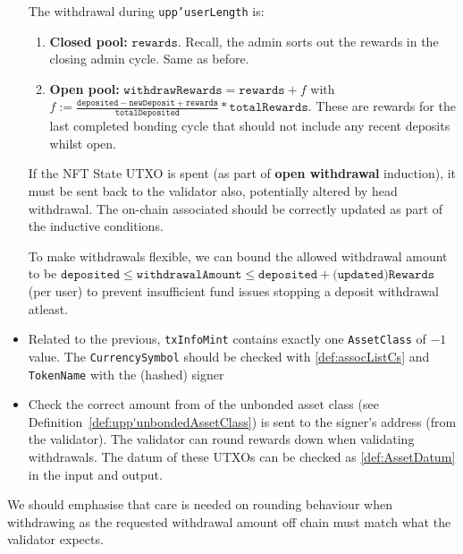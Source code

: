 \documentclass[10pt, a4paper]{article}
\theoremstyle{definition}
\begin{document}
\begin{itemize}
{The withdrawal during \texttt{upp'userLength} is:
\begin{enumerate}
\item{\textbf{Closed pool:}
 $\texttt{rewards}$.  Recall, the admin sorts out the rewards in the closing admin cycle. Same as before.}
\item{\textbf{Open pool:} $\texttt{withdrawRewards} = \texttt{rewards} + f$
with $f := \frac{\texttt{deposited} - \texttt{newDeposit} + \texttt{rewards}}{\texttt{totalDeposited}} * \texttt{totalRewards}$. These are rewards for the last completed bonding cycle that should not include any recent deposits whilst open.}
\end{enumerate}

 If the NFT State UTXO is spent (as part of \textbf{open withdrawal} induction), it must be sent back to the validator also, potentially altered by head withdrawal. The on-chain associated should be correctly updated as part of the inductive conditions.
 
To make withdrawals flexible, we can bound the allowed withdrawal amount to be  $\texttt{deposited} \leq \texttt{withdrawalAmount} \leq \texttt{deposited} + \texttt{(updated)Rewards}$ (per user) to prevent insufficient fund issues stopping a deposit withdrawal atleast.
 }
\item{Related to the previous, \texttt{txInfoMint} contains exactly one \texttt{AssetClass} of $-1$ value. The \texttt{CurrencySymbol} should be checked with \ref{def:assocListCs} and \texttt{TokenName} with the (hashed) signer}
\item{Check the correct amount from of the unbonded asset class (see Definition~\ref{def:upp'unbondedAssetClass}) is sent to the signer's address (from the validator). The validator can round rewards down when validating withdrawals. The datum of these UTXOs can be checked as \ref{def:AssetDatum} in the input and output.} 
\end{itemize}
We should emphasise that care is needed on rounding behaviour when withdrawing as the requested withdrawal amount off chain must match what the validator expects.
\end{document}
